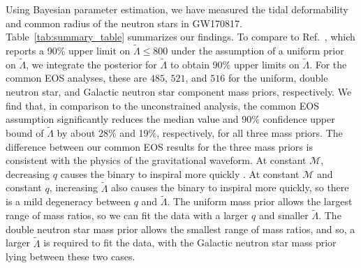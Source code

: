 Using Bayesian parameter estimation, we have measured the tidal deformability and common radius of the neutron stars in GW170817. Table~\ref{tab:summary_table} summarizes our findings.  To compare to Ref.~\cite{TheLIGOScientific:2017qsa}, which reports a 90\% upper limit on $\tilde\Lambda \le 800$ under the assumption of a uniform prior on $\tilde\Lambda$, we integrate the posterior for $\tilde{\Lambda}$ to obtain 90\% upper limits on $\tilde{\Lambda}$.   For the common EOS analyses, these are $485$, $521$, and $516$ for the uniform, double neutron star, and Galactic neutron star component mass priors, respectively. We find that, in comparison to the unconstrained analysis, the common EOS assumption significantly reduces the median value and 90\% confidence upper bound of $\tilde\Lambda$ by about 28\% and 19\%, respectively, for all three mass priors. The difference between our common EOS results for the three mass priors is consistent with the physics of the gravitational waveform. At constant $\mathcal{M}$, decreasing $q$ causes the binary to inspiral more quickly \cite{Hannam:2013uu}. At constant $\mathcal{M}$ and constant $q$, increasing $\tilde\Lambda$ also causes the binary to inspiral more quickly, so there is a mild degeneracy between $q$ and $\tilde\Lambda$. The uniform mass prior allows the largest range of mass ratios, so we can fit the data with a larger $q$ and smaller $\tilde\Lambda$. The double neutron star mass prior allows the smallest range of mass ratios, and so, a larger $\tilde\Lambda$ is required to fit the data, with the Galactic neutron star mass prior lying between these two cases. 

